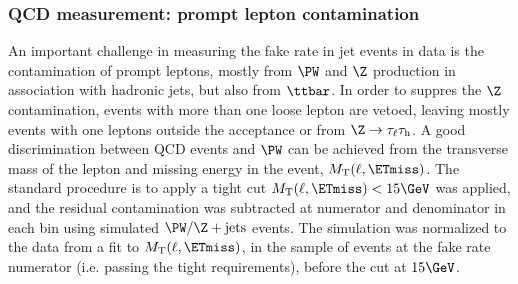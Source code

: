
\subsubsection{QCD measurement: prompt lepton contamination}
An important challenge in measuring the fake rate in jet events in data is the contamination of prompt leptons, mostly from $\PW$ and $\Z$ production in association with hadronic jets, but also from $\ttbar$. In order to suppres the $\Z$ contamination, events with more than one loose lepton are vetoed, leaving mostly events with one leptons outside the acceptance or from $\Z\to\tau_{\ell}\tau_\mathrm{h}$.
A good discrimination between QCD events and $\PW$ can be achieved from the transverse mass of the lepton and missing energy in the event, $M_\mathrm{T}(\ell,\ETmiss)$. 
The standard procedure is to apply a tight cut $M_\mathrm{T}(\ell,\ETmiss)<15\GeV$ was applied, and the residual contamination was subtracted at numerator and denominator in each \pt bin using simulated $\PW/\Z+\mathrm{jets}$ events. The simulation was normalized to the data from a fit to $M_\mathrm{T}(\ell,\ETmiss)$, in the sample of events at the fake rate numerator (i.e. passing the tight requirements), before the cut at $15\GeV$.

